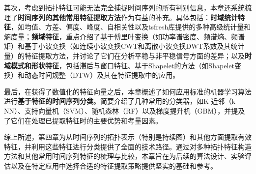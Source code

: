 其次，考虑到拓扑特征可能无法完全捕捉时间序列的所有判别信息，本章还系统梳理了\textbf{时间序列的其他常用特征提取方法}作为有益的补充。具体包括：\textbf{时域统计特征}，如均值、方差、偏度、峰度、自相关性以及tsfresh库\cite{christ2018time}提供的多种高级统计量和熵度量；\textbf{频域特征}，重点介绍了基于傅里叶变换（如功率谱密度、频谱熵、频谱矩）和基于小波变换（如连续小波变换CWT和离散小波变换DWT系数及其统计量）的特征提取方法\cite{yi2023survey, rhif2019wavelet}，并讨论了它们在分析平稳与非平稳信号方面的差异；以及\textbf{时域模式和形状特征}，包括滞后与窗口特征、基于Shapelet的方法（如Shapelet变换）和动态时间规整（DTW）及其在特征提取中的应用。

最后，在获得了数值化的特征向量之后，本章概述了如何应用标准的机器学习算法进行\textbf{基于特征的时间序列分类}。简要介绍了几种常用的分类器，如K-近邻（k-NN）、支持向量机（SVM）、随机森林（RF）以及梯度提升机（GBM），并提及了它们在处理已提取特征时的主要优势和考量因素。

综上所述，第四章为从时间序列的拓扑表示（特别是持续图）和其他方面提取有效特征，并利用这些特征进行分类提供了全面的技术路径。通过对多种拓扑特征构造方法和其他常用时间序列特征的梳理与比较，本章旨在为后续的算法设计、实验评估以及在特定应用中选择合适的特征提取策略提供坚实的基础和参考。